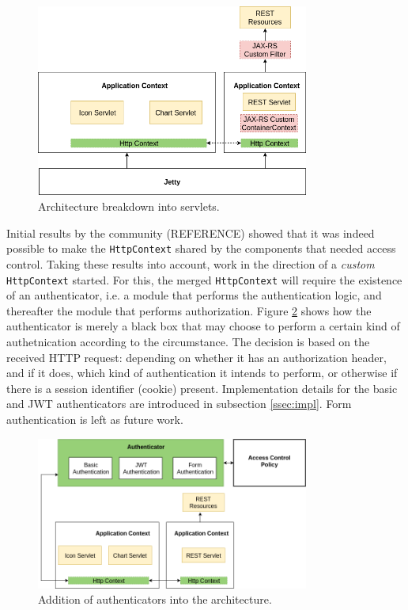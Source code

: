 \documentclass[12pt]{article}
\begin{document}
\begin{figure} [ht] 
\begin{center}
\includegraphics[width=0.8\textwidth]{esh_auth_arch}
\caption{Architecture breakdown into servlets.}
\label{fig:esh_auth_arch}
\end{center}
\end{figure}

Initial results by the community (REFERENCE) showed that it was indeed possible to make the \texttt{HttpContext} shared by the components that needed access control. Taking these results into account, work in the direction of a \emph{custom} \texttt{HttpContext} started. For this, the merged \texttt{HttpContext} will require the existence of an authenticator, i.e. a module that performs the authentication logic, and thereafter the module that performs authorization. Figure \ref{fig:esh_arch_authenticator} shows how the authenticator is merely a black box that may choose to perform a certain kind of authetnication according to the circumstance. The decision is based on the received HTTP request: depending on whether it has an authorization header, and if it does, which kind of authentication it intends to perform, or otherwise if there is a session identifier (cookie) present. Implementation details for the basic and JWT authenticators are introduced in subsection \ref{ssec:impl}. Form authentication is left as future work. 

\begin{figure} [ht] 
\begin{center}
\includegraphics[width=0.8\textwidth]{esh_arch_authenticator}
\caption{Addition of authenticators into the architecture.}
\label{fig:esh_arch_authenticator}
\end{center}
\end{figure}
\end{document}
